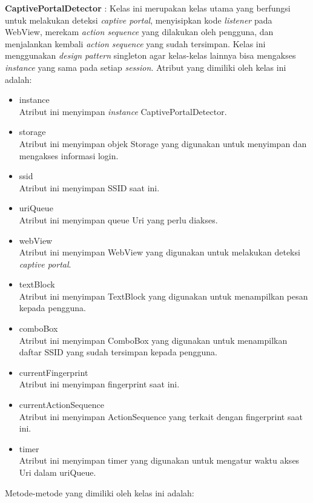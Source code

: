 \par{\textbf{CaptivePortalDetector} : Kelas ini merupakan kelas utama yang berfungsi untuk melakukan deteksi \textit{captive portal}, menyisipkan kode \textit{listener} pada WebView, merekam \textit{action sequence} yang dilakukan oleh pengguna, dan menjalankan kembali \textit{action sequence} yang sudah tersimpan. Kelas ini menggunakan \textit{design pattern} singleton agar kelas-kelas lainnya bisa mengakses \textit{instance} yang sama pada setiap \textit{session}. Atribut yang dimiliki oleh kelas ini adalah:
    \begin{itemize}
        \item{instance\\Atribut ini menyimpan \textit{instance} CaptivePortalDetector.}
        \item{storage\\Atribut ini menyimpan objek Storage yang digunakan untuk menyimpan dan mengakses informasi login.}
        \item{ssid\\Atribut ini menyimpan SSID saat ini.}
        \item{uriQueue\\Atribut ini menyimpan queue Uri yang perlu diakses.}
        \item{webView\\Atribut ini menyimpan WebView yang digunakan untuk melakukan deteksi \textit{captive portal}.}
        \item{textBlock\\Atribut ini menyimpan TextBlock yang digunakan untuk menampilkan pesan kepada pengguna.}
        \item{comboBox\\Atribut ini menyimpan ComboBox yang digunakan untuk menampilkan daftar SSID yang sudah tersimpan kepada pengguna.}
        \item{currentFingerprint\\Atribut ini menyimpan fingerprint saat ini.}
        \item{currentActionSequence\\Atribut ini menyimpan ActionSequence yang terkait dengan fingerprint saat ini.}
        \item{timer\\Atribut ini menyimpan timer yang digunakan untuk mengatur waktu akses Uri dalam uriQueue.}
    \end{itemize}
    Metode-metode yang dimiliki oleh kelas ini adalah:
    \begin{itemize}

\end{itemize}}
